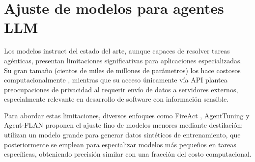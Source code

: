 \section{Ajuste de modelos para agentes LLM}

Los modelos instruct del estado del arte, aunque capaces de resolver tareas agénticas, presentan limitaciones significativas para aplicaciones especializadas. Su gran tamaño (cientos de miles de millones de parámetros) los hace costosos computacionalmente \cite{noauthor_number_2024}, mientras que su acceso únicamente vía API plantea preocupaciones de privacidad al requerir envío de datos a servidores externos, especialmente relevante en desarrollo de software con información sensible.

Para abordar estas limitaciones, diversos enfoques como FireAct \cite{chen_fireact_2023}, AgentTuning \cite{zeng_agenttuning_2023} y Agent-FLAN \cite{chen_agent-flan_2024} proponen el ajuste fino de modelos menores mediante destilación: utilizan un modelo grande para generar datos sintéticos de entrenamiento, que posteriormente se emplean para especializar modelos más pequeños en tareas específicas, obteniendo precisión similar con una fracción del costo computacional.
